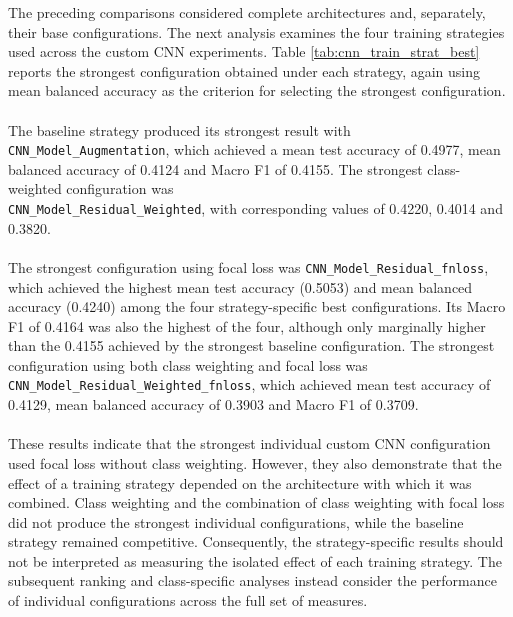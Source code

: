 \documentclass[12pt, a4paper]{report}
\begin{document}
				The preceding comparisons considered complete architectures and, separately, their base configurations. The next analysis examines the four training strategies used across the custom CNN experiments. Table \ref{tab:cnn_train_strat_best} reports the strongest configuration obtained under each strategy, again using mean balanced accuracy as the criterion for selecting the strongest configuration.\\\\
				The baseline strategy produced its strongest result with \texttt{CNN\_Model\_Augmentation}, which achieved a mean test accuracy of 0.4977, mean balanced accuracy of 0.4124 and Macro F1 of 0.4155. The strongest class-weighted configuration was \\\texttt{CNN\_Model\_Residual\_Weighted}, with corresponding values of 0.4220, 0.4014 and 0.3820.\\\\
				The strongest configuration using focal loss was \texttt{CNN\_Model\_Residual\_fnloss}, which achieved the highest mean test accuracy (0.5053) and mean balanced accuracy (0.4240) among the four strategy-specific best configurations. Its Macro F1 of 0.4164 was also the highest of the four, although only marginally higher than the 0.4155 achieved by the strongest baseline configuration. The strongest configuration using both class weighting and focal loss was \\\texttt{CNN\_Model\_Residual\_Weighted\_fnloss}, which achieved mean test accuracy of 0.4129, mean balanced accuracy of 0.3903 and Macro F1 of 0.3709.\\\\
				These results indicate that the strongest individual custom CNN configuration used focal loss without class weighting. However, they also demonstrate that the effect of a training strategy depended on the architecture with which it was combined. Class weighting and the combination of class weighting with focal loss did not produce the strongest individual configurations, while the baseline strategy remained competitive. Consequently, the strategy-specific results should not be interpreted as measuring the isolated effect of each training strategy. The subsequent ranking and class-specific analyses instead consider the performance of individual configurations across the full set of measures.\\
				\setlength{\tabcolsep}{3pt}
\end{document}
